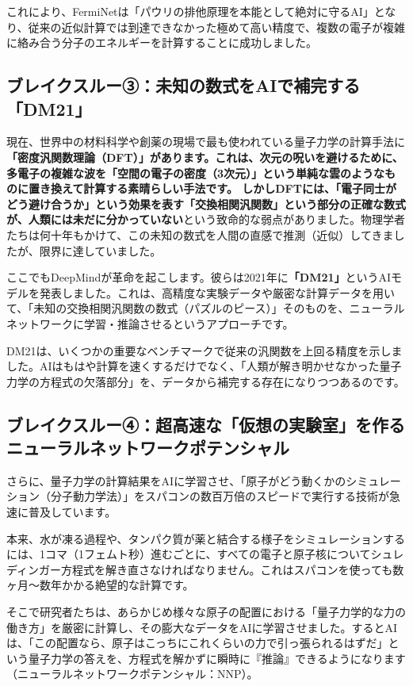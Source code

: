 これにより、FermiNetは「パウリの排他原理を本能として絶対に守るAI」となり、従来の近似計算では到達できなかった極めて高い精度で、複数の電子が複雑に絡み合う分子のエネルギーを計算することに成功しました。

\subsection{ブレイクスルー③：未知の数式をAIで補完する「DM21」}

現在、世界中の材料科学や創薬の現場で最も使われている量子力学の計算手法に\textbf{「密度汎関数理論（DFT）」があります。これは、次元の呪いを避けるために、多電子の複雑な波を「空間の電子の密度（3次元）」という単純な雲のようなものに置き換えて計算する素晴らしい手法です。 しかしDFTには、「電子同士がどう避け合うか」という効果を表す「交換相関汎関数」という部分の正確な数式が、人類には未だに分かっていない}という致命的な弱点がありました。物理学者たちは何十年もかけて、この未知の数式を人間の直感で推測（近似）してきましたが、限界に達していました。

ここでもDeepMindが革命を起こします。彼らは2021年に\textbf{「DM21」}というAIモデルを発表しました。これは、高精度な実験データや厳密な計算データを用いて、「未知の交換相関汎関数の数式（パズルのピース）」そのものを、ニューラルネットワークに学習・推論させるというアプローチです。

DM21は、いくつかの重要なベンチマークで従来の汎関数を上回る精度を示しました。AIはもはや計算を速くするだけでなく、「人類が解き明かせなかった量子力学の方程式の欠落部分」を、データから補完する存在になりつつあるのです。

\subsection{ブレイクスルー④：超高速な「仮想の実験室」を作るニューラルネットワークポテンシャル}

さらに、量子力学の計算結果をAIに学習させ、「原子がどう動くかのシミュレーション（分子動力学法）」をスパコンの数百万倍のスピードで実行する技術が急速に普及しています。

本来、水が凍る過程や、タンパク質が薬と結合する様子をシミュレーションするには、1コマ（1フェムト秒）進むごとに、すべての電子と原子核についてシュレディンガー方程式を解き直さなければなりません。これはスパコンを使っても数ヶ月〜数年かかる絶望的な計算です。

そこで研究者たちは、あらかじめ様々な原子の配置における「量子力学的な力の働き方」を厳密に計算し、その膨大なデータをAIに学習させました。するとAIは、「この配置なら、原子はこっちにこれくらいの力で引っ張られるはずだ」という量子力学の答えを、方程式を解かずに瞬時に『推論』できるようになります（ニューラルネットワークポテンシャル：NNP）。

